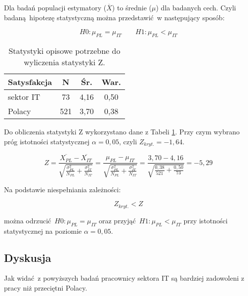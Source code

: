 Dla badań populacji estymatory ($\overline{X}$) to średnie ($\mu$) dla badanych cech. Czyli badaną hipotezę statystyczną można przedstawić w następujący sposób:

\begin{equation}
  H0: \mu_{PL} = \mu_{IT} \qquad H1: \mu_{PL} < \mu_{IT}
\end{equation}

\begin{table}[h!b]
  \begin{center}
    \begin{tabular}{l | c c c }
      Satysfakcja & N & Śr. & War. \\ \hline
      sektor IT & 73 & 4,16 & 0,50 \\
      Polacy & 521 & 3,70 & 0,38 \\
    \end{tabular}
  \end{center}
  \caption{Statystyki opisowe potrzebne do wyliczenia statystyki Z.}
  \label{tab:jss-norms-data}
\end{table}

Do obliczenia statystyki Z wykorzystano dane z Tabeli \ref{tab:jss-norms-data}. Przy czym wybrano próg istotności statystycznej $\alpha = 0,05$, czyli $Z_{kryt.} = -1,64$.

\begin{equation}
  Z = \frac{\overline{X_{PL}} - \overline{X_{IT}}}{\sqrt{\frac{\sigma^2_{PL}}{N_{PL}}+\frac{\sigma^2_{IT}}{N_{IT}}}} = \frac{\mu_{PL} - \mu_{IT}}{\sqrt{\frac{\sigma^2_{PL}}{N_{PL}}+\frac{\sigma^2_{IT}}{N_{IT}}}} = \frac{3,70 - 4,16}{\sqrt{\frac{0,38}{521}+\frac{0,50}{73}}} = -5,29 
\end{equation}

Na podstawie niespełniania zależności:

\begin{equation}
  Z_{kryt.} < Z
\end{equation}

można odrzucić $H0: \mu_{PL} = \mu_{IT}$ oraz przyjąć $H1: \mu_{PL} < \mu_{IT}$ przy istotności statystycznej na poziomie $\alpha = 0,05$.

\subsection{Dyskusja}
Jak widać z powyższych badań pracownicy sektora IT są bardziej zadowoleni z pracy niż przeciętni Polacy. 

